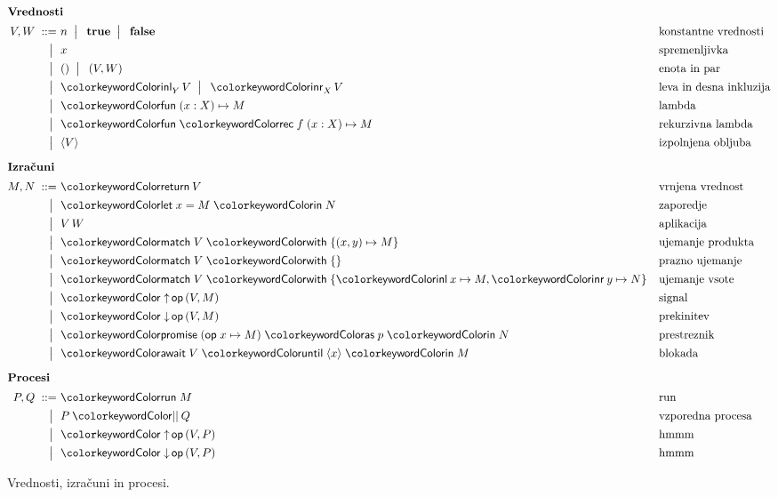 \documentclass[12pt,a4paper,twoside]{article}
\theoremstyle{definition} %
\theoremstyle{plain} %
\numberwithin{equation}{section}  %
\begin{document}
\begin{figure}[hp]
	\parbox{\textwidth}{
		\centering
		\small
		\begin{align*}
		\intertext{\textbf{Vrednosti}}
		V, W
		\bnfis& n \bnfor\! \true \bnfor\! \false        & &\text{konstantne vrednosti} \\
		\bnfor& x                                       & &\text{spremenljivka} \\
		\bnfor& \tmunit \bnfor\! \tmpair{V}{W}          & &\text{enota in par} \\
		\bnfor& \tminl[Y]{V} \bnfor\! \tminr[X]{V}      & &\text{leva in desna inkluzija} \\
		\bnfor& \tmfun{x : X}{M}                        & &\text{lambda} \\
		\bnfor& \tmfunrec{f}{x : X}{M}                        & &\text{rekurzivna lambda} \\
		\bnfor& \tmpromise V                            & &\text{izpolnjena obljuba}
		\\[1ex]
		\intertext{\textbf{Izračuni}}
		M, N
		\bnfis& \tmreturn{V}                            & &\text{vrnjena vrednost} \\
		\bnfor& \tmlet{x}{M}{N}                         & &\text{zaporedje} \\
		\bnfor& V\,W                                    & &\text{aplikacija} \\
		\bnfor& \tmmatch{V}{\tmpair{x}{y} \mapsto M}    & &\text{ujemanje produkta} \\
		\bnfor& \tmmatch[]{V}{}                        & &\text{prazno ujemanje} \\
		\bnfor& \tmmatch{V}{\tminl{x} \mapsto M, \tminr{y} \mapsto N}	& &\text{ujemanje vsote} \\
		\bnfor& \tmopout{op}{V}{M}       & &\text{signal} \\
		\bnfor& \tmopin{op}{V}{M}          & &\text{prekinitev} \\
		\bnfor& \tmwith{op}{x}{M}{p}{N}      & &\text{prestreznik} \\
		\bnfor& \tmawait{V}{x}{M}             & &\text{blokada}
			\\[1ex]
		\intertext{\textbf{Procesi}}
		  P, Q
		\bnfis & \tmrun M & & \text{run} \\
		\bnfor & \tmpar P Q & & \text{vzporedna procesa} \\
		\bnfor & \tmopout{op}{V}{P} & & \text{hmmm} \\
		\bnfor & \tmopin{op}{V}{P} & & \text{hmmm}
		\end{align*}
	} 
	\caption{Vrednosti, izračuni in procesi.}
	\label{fig:izrazi}
\end{figure}
\end{document}

